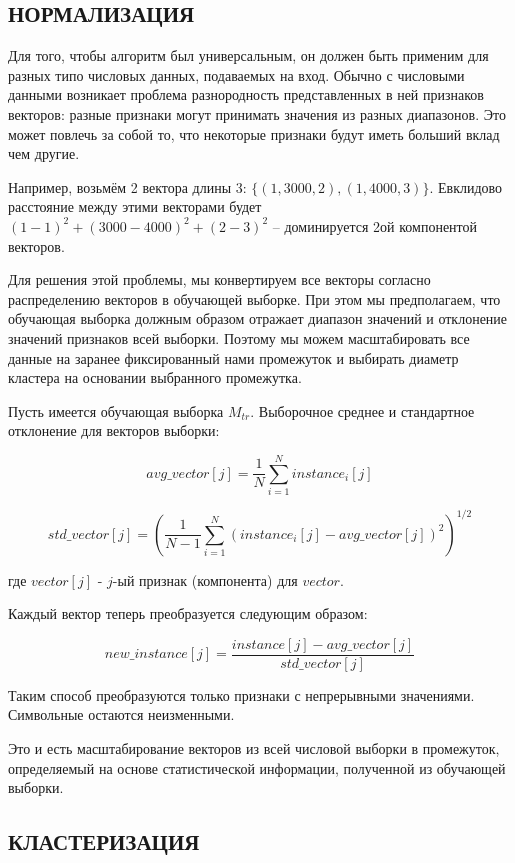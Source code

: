 \documentclass[12pt,a4paper]{article}
\begin{document}
\subsection{НОРМАЛИЗАЦИЯ}

Для того, чтобы алгоритм был универсальным, он должен быть применим для разных типо числовых данных,
подаваемых на вход. Обычно с числовыми данными возникает проблема разнородность представленных в ней
признаков векторов: разные признаки могут принимать значения из разных диапазонов. Это может повлечь
за собой то, что некоторые признаки будут иметь больший вклад чем другие.

Например, возьмём 2 вектора длины 3: $\{(1,3000,2),(1,4000,3)\}$. Евклидово расстояние между этими векторами
будет $(1-1)^2 + (3000-4000)^2 + (2-3)^2$ -- доминируется 2ой компонентой векторов.

Для решения этой проблемы, мы конвертируем все векторы согласно распределению векторов в обучающей выборке.
При этом мы предполагаем, что обучающая выборка должным образом отражает диапазон значений и отклонение
значений признаков всей выборки. Поэтому мы можем масштабировать все данные на заранее фиксированный нами
промежуток и выбирать диаметр кластера на основании выбранного промежутка.

Пусть имеется обучающая выборка $M_{tr}$. Выборочное среднее и стандартное отклонение для векторов выборки:

$$\textit{avg\_vector}[j] = \frac{1}{N} \sum_{i=1}^N \textit{instance}_i[j]$$


$$\textit{std\_vector}[j] = (\frac{1}{N-1} \sum_{i=1}^N (\textit{instance}_i[j] - \textit{avg\_vector}[j])^2)^{1/2}$$

где $\textit{vector}[j]$ - $j$-ый признак (компонента) для $\textit{vector}$.

Каждый вектор теперь преобразуется следующим образом:

$$\textit{new\_instance}[j] = \frac{\textit{instance}[j] - \textit{avg\_vector}[j]}{\textit{std\_vector}[j]}$$


Таким способ преобразуются только признаки с непрерывными значениями. Символьные остаются неизменными.

Это и есть масштабирование векторов из всей числовой выборки в промежуток, определяемый на основе
статистической информации, полученной из обучающей выборки.

\subsection{КЛАСТЕРИЗАЦИЯ}
\end{document}
